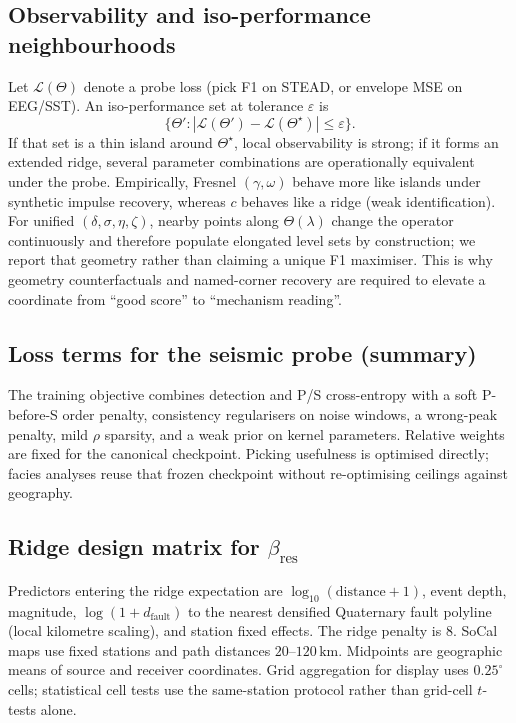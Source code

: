 \documentclass[twocolumn,10pt]{article}
\newcommand{\stead}{\textsc{STEAD}}
\begin{document}
\subsection*{Observability and iso-performance neighbourhoods}
\label{snote:observability}
Let \(\mathcal{L}(\Theta)\) denote a probe loss (pick F1 on \stead{}, or
envelope MSE on EEG/SST). An iso-performance set at tolerance \(\varepsilon\) is
\[
\{\Theta' : |\mathcal{L}(\Theta')-\mathcal{L}(\Theta^{\star})|\le\varepsilon\}.
\]
If that set is a thin island around \(\Theta^{\star}\), local observability is
strong; if it forms an extended ridge, several parameter combinations are
operationally equivalent under the probe. Empirically, Fresnel
\((\gamma,\omega)\) behave more like islands under synthetic impulse recovery,
whereas \(c\) behaves like a ridge (weak identification). For unified
\((\delta,\sigma,\eta,\zeta)\), nearby points along \(\Theta(\lambda)\) change
the operator continuously and therefore populate elongated level sets by
construction; we report that geometry rather than claiming a unique F1
maximiser. This is why geometry counterfactuals and named-corner recovery are
required to elevate a coordinate from ``good score'' to ``mechanism reading''.

\subsection*{Loss terms for the seismic probe (summary)}
The training objective combines detection and P/S cross-entropy with a soft
P-before-S order penalty, consistency regularisers on noise windows, a
wrong-peak penalty, mild \(\rho\) sparsity, and a weak prior on kernel
parameters. Relative weights are fixed for the canonical checkpoint. Picking
usefulness is optimised directly; facies analyses reuse that frozen checkpoint
without re-optimising ceilings against geography.

\subsection*{Ridge design matrix for \(\beta_{\mathrm{res}}\)}
Predictors entering the ridge expectation are
\(\log_{10}(\mathrm{distance}+1)\), event depth, magnitude,
\(\log(1+d_{\mathrm{fault}})\) to the nearest densified Quaternary fault
polyline (local kilometre scaling), and station fixed effects. The ridge penalty
is \(8\). SoCal maps use fixed stations and path distances
\(20\)--\(120\,\mathrm{km}\). Midpoints are geographic means of source and
receiver coordinates. Grid aggregation for display uses \(0.25^\circ\) cells;
statistical cell tests use the same-station protocol rather than grid-cell
\(t\)-tests alone.
\end{document}

